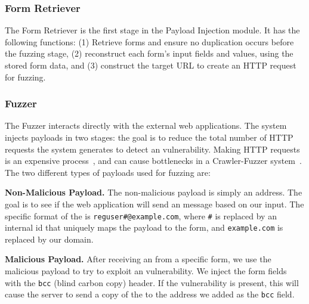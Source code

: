 

\subsubsection{\Email Form Retriever}
\label{Comp:EMFR}
The \Email Form Retriever is the first stage in the Payload Injection
module. It has the following functions: (1) Retrieve forms and
ensure no duplication occurs before the fuzzing stage, (2) reconstruct
each form's input fields
and values, using the stored form data, and (3) construct the target URL
to create an HTTP request for fuzzing.


\subsubsection{Fuzzer}
\label{Comp:Fuzzer}
The Fuzzer interacts directly with the external web applications. The system injects payloads in two stages: the goal is to reduce the total number of HTTP requests the system generates to detect an \ehi vulnerability. Making HTTP requests is an expensive process~\cite{httpperf}, and can cause bottlenecks in a Crawler-Fuzzer system~\cite{ShkapenyukTorstenSuel2001}.
The two different types of payloads used for fuzzing are:

\noindent\textbf{Non-Malicious Payload.}
The non-malicious payload is simply an \email address. The goal is to see if the web application will send an \email message based on our input. The specific format of the \email is \lstinline|reguser#@example.com|, where \texttt{\#} is replaced by an internal id that uniquely maps the payload to the form, and \texttt{example.com} is replaced by our domain.

\noindent\textbf{Malicious Payload.}
After receiving an \email from a specific form, we use the malicious payload to try to exploit an \ehi vulnerability. We inject the form fields with the \texttt{bcc} (blind carbon copy) header. If the vulnerability is present, this will cause the server to send a copy of the \email to the \email address we added as the \texttt{bcc} field.


